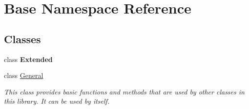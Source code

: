 \hypertarget{namespace_base}{}\section{Base Namespace Reference}
\label{namespace_base}
\subsection*{Classes}
\begin{DoxyCompactItemize}
\item 
class {\bfseries Extended}
\item 
class \mbox{\hyperlink{class_base_1_1_general}{General}}
\begin{DoxyCompactList}\small\item\em This class provides basic functions and methods that are used by other classes in this library. It can be used by itself. \end{DoxyCompactList}\end{DoxyCompactItemize}
